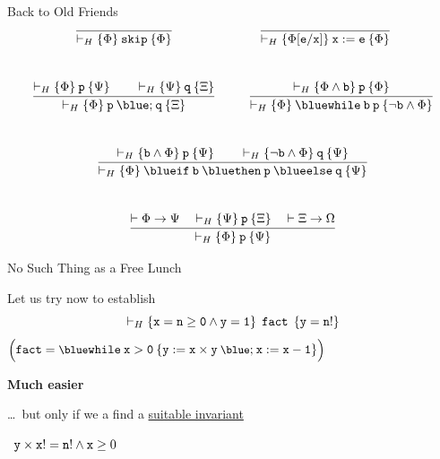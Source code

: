 \documentclass{beamer}
\begin{document}
\begin{frame}{Back to Old Friends}
        \[
                \infer{ \vdash_H \{ \Phi \} \> \prog{skip} \> \{ \Phi \} }{}
                \hspace{2.5cm}
                \infer{ \vdash_H \{ \Phi[\prog{e}/\prog{x}] \} \> \prog{ x : = e } \>
                \{ \Phi \} }{}
        \]
        \\[1pt]
        \[
                \infer { \vdash_H \{ \Phi \} \> \prog{p \> {\blue ;} \> q} \> \{ \Xi \} }{
                        \vdash_H \{ \Phi \} \> \prog{p} \> \{ \Psi \}
                        \qquad
                        \vdash_H \{ \Psi \} \> \prog{q} \> \{ \Xi \}
                }
                \hspace{1cm}
                \infer{
                        \vdash_H \{ \Phi \} \> \prog{{\blue while}} \> \prog{b} \>
                        \prog{p} \> 
                        \{ \neg \prog{b} \wedge \Phi \}
                }{
                        \vdash_H
                        \{ \Phi \wedge \prog{b} \} \> \prog{p} \> \{ \Phi \}
                }
        \]
        \\[1pt]
        \[
                \infer {
                        \vdash_H \{ \Phi \} \> \prog{{\blue if} \> b}
                        \> \prog{{\blue then}} \>
                        \prog{p} \> \prog{{\blue else}} \> \prog{q}
                        \> \{ \Psi \}
                }{
                        \vdash_H \{ \prog{b} \wedge \Phi \} \> \prog{p} \> \{ \Psi \}
                        \qquad
                        \vdash_H \{ \prog{\neg b} \wedge \Phi \} \> \prog{q} \> \{ \Psi \}
                }
        \]
        \\[1pt]
        \[
                \infer{ \vdash_H \{ \Phi \} \> \prog{p} \> \{ \Psi \} }{
                        \vdash \Phi \rightarrow \Psi
                        \quad
                        \vdash_H \{ \Psi \} \> \prog{p} \> \{ \Xi \}
                        \quad
                        \vdash \Xi \rightarrow \Omega
                }
        \]
\end{frame}

\begin{frame}{No Such Thing as a Free Lunch}

        Let us try now to establish
        \[
                \vdash_H \{ \mathtt{x = n \geq 0 \wedge y = 1} \} \> \> \mathtt{fact} \> \>
                \{ \mathtt{y = n!} \}
        \]
        ${\small \Big ( \prog{fact} = \prog{{\blue while} \> x > 0 \> \{ y :=
        x \times y \> {\blue ;} \> x := x - 1 \} } \Big )}$

        \pause
        \medskip
        \textbf{Much easier} 

        \dots\, but only if we a find a \alert{\underline{suitable invariant}}

        \eg\ $\mathtt{y} \times \mathtt{x}! = \mathtt{n}! \wedge \mathtt{x} \geq 0$

        \pause
        \bigskip
        \begin{center}
        \end{center}
\end{frame}
\end{document}
